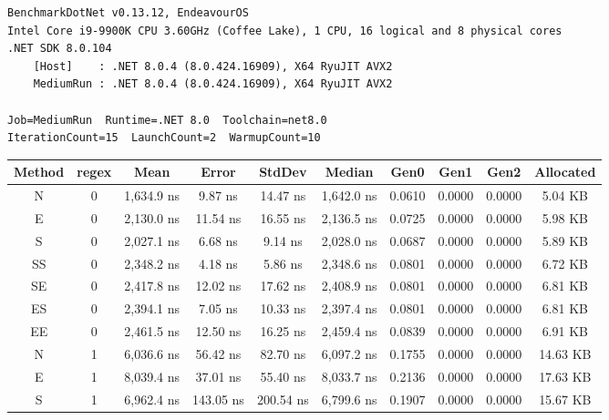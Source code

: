 
\begin{lstlisting}[basicstyle=\ttfamily]
BenchmarkDotNet v0.13.12, EndeavourOS
Intel Core i9-9900K CPU 3.60GHz (Coffee Lake), 1 CPU, 16 logical and 8 physical cores
.NET SDK 8.0.104
    [Host]    : .NET 8.0.4 (8.0.424.16909), X64 RyuJIT AVX2
    MediumRun : .NET 8.0.4 (8.0.424.16909), X64 RyuJIT AVX2

Job=MediumRun  Runtime=.NET 8.0  Toolchain=net8.0
IterationCount=15  LaunchCount=2  WarmupCount=10
\end{lstlisting}

\begin{sidewaystable}
    \begin{tabular}{|c|c|c|c|c|c|c|c|c|c|}
        \hline
        Method & regex & Mean            & Error         & StdDev        & Median          & Gen0     & Gen1     & Gen2     & Allocated   \\
        \hline
        N      & 0     & 1,634.9 ns      & 9.87 ns       & 14.47 ns      & 1,642.0 ns      & 0.0610   & 0.0000   & 0.0000   & 5.04 KB     \\
        E      & 0     & 2,130.0 ns      & 11.54 ns      & 16.55 ns      & 2,136.5 ns      & 0.0725   & 0.0000   & 0.0000   & 5.98 KB     \\
        S      & 0     & 2,027.1 ns      & 6.68 ns       & 9.14 ns       & 2,028.0 ns      & 0.0687   & 0.0000   & 0.0000   & 5.89 KB     \\
        SS     & 0     & 2,348.2 ns      & 4.18 ns       & 5.86 ns       & 2,348.6 ns      & 0.0801   & 0.0000   & 0.0000   & 6.72 KB     \\
        SE     & 0     & 2,417.8 ns      & 12.02 ns      & 17.62 ns      & 2,408.9 ns      & 0.0801   & 0.0000   & 0.0000   & 6.81 KB     \\
        ES     & 0     & 2,394.1 ns      & 7.05 ns       & 10.33 ns      & 2,397.4 ns      & 0.0801   & 0.0000   & 0.0000   & 6.81 KB     \\
        EE     & 0     & 2,461.5 ns      & 12.50 ns      & 16.25 ns      & 2,459.4 ns      & 0.0839   & 0.0000   & 0.0000   & 6.91 KB     \\
        N      & 1     & 6,036.6 ns      & 56.42 ns      & 82.70 ns      & 6,097.2 ns      & 0.1755   & 0.0000   & 0.0000   & 14.63 KB    \\
        E      & 1     & 8,039.4 ns      & 37.01 ns      & 55.40 ns      & 8,033.7 ns      & 0.2136   & 0.0000   & 0.0000   & 17.63 KB    \\
        S      & 1     & 6,962.4 ns      & 143.05 ns     & 200.54 ns     & 6,799.6 ns      & 0.1907   & 0.0000   & 0.0000   & 15.67 KB    \\

\end{tabular}
\end{sidewaystable}

